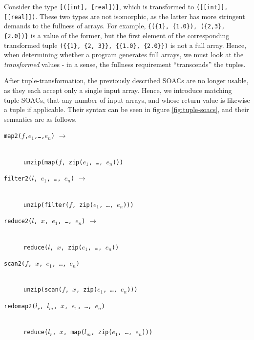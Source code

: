 \documentclass{sigplanconf}  %
\begin{document}
Consider the type {\tt [([int], [real])]}, which is transformed to
{\tt([[int]], [[real]])}.  These two types are not isomorphic, as the
latter has more stringent demands to the fullness of arrays.  For
example, {\tt\{(\{1\}, \{1.0\}), (\{2,3\}, \{2.0\})\}} is a value of
the former, but the first element of the corresponding transformed
tuple {\tt(\{\{1\}, \{2, 3\}\}, \{\{1.0\}, \{2.0\}\})} is not a full
array.  Hence, when determining whether a program generates full
arrays, we must look at the \textit{transformed} values - in a sense,
the fullness requirement ``transcends'' the tuples.

After tuple-transformation, the previously described SOACs are no
longer usable, as they each accept only a single input array.  Hence,
we introduce matching tuple-SOACs, that any number of input arrays,
and whose return value is likewise a tuple if applicable.  Their
syntax can be seen in figure \ref{fig:tuple-soacs}, and their
semantics are as follows.

\begin{description}
  \item[{\tt map2($f$,$e_{1}$,\ldots,$e_{n}$)} $\rightarrow$]\hfill\\
    {\tt unzip(map($f$, zip($e_{1}$, \ldots, $e_{n}$)))}


  \item[{\tt filter2($l$, $e_{1}$, \ldots, $e_{n}$)} $\rightarrow$]\hfill\\
    {\tt unzip(filter($f$, zip($e_{1}$, \ldots, $e_{n}$)))}

  \item[{\tt reduce2($l$, $x$, $e_{1}$, \ldots, $e_{n}$)} $\rightarrow$]\hfill\\
    {\tt reduce($l$, $x$, zip($e_{1}$, \ldots, $e_{n}$))}

  \item[{\tt scan2($f$, $x$, $e_{1}$, \ldots, $e_{n}$)}]\hfill\\
    {\tt unzip(scan($f$, $x$, zip($e_{1}$, \ldots, $e_{n}$)))}

  \item[{\tt redomap2($l_{r}$, $l_{m}$, $x$, $e_{1}$, \ldots, $e_{n}$)}]\hfill\\
    {\tt reduce($l_{r}$, $x$, map($l_{m}$, zip($e_{1}$, \ldots, $e_{n}$)))}
\end{description}
\end{document}
